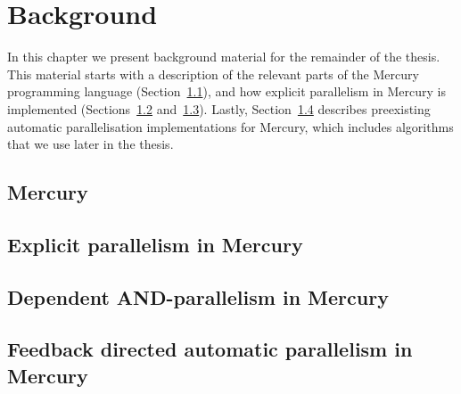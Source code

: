 
\chapter{Background}
\label{chap:backgnd}

In this chapter we present background material for the remainder of the
thesis.
This material starts with a description of the relevant parts of the Mercury
programming language (Section~\ref{sec:backgnd_mercury}),
and how explicit parallelism in Mercury is implemented
(Sections~\ref{sec:backgnd_merpar} and~\ref{sec:backgnd_deppar}).
Lastly, Section~\ref{sec:backgnd_autopar} describes preexisting automatic
parallelisation implementations for Mercury,
which includes algorithms that we use later in the thesis.

\section{Mercury}
\label{sec:backgnd_mercury}


\section{Explicit parallelism in Mercury}
\label{sec:backgnd_merpar}


\section{Dependent AND-parallelism in Mercury}
\label{sec:backgnd_deppar}


\section{Feedback directed automatic parallelism in Mercury}
\label{sec:backgnd_autopar}



